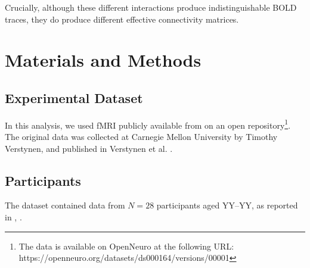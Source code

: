 \documentclass[10pt,letterpaper]{article}
\begin{document}
Crucially, although these different interactions produce indistinguishable BOLD traces, they do produce different effective connectivity matrices.


\section{Materials and Methods}

\subsection{Experimental Dataset}

In this analysis, we used fMRI publicly available from on an open repository\footnote{The data is available on OpenNeuro at the following URL:  https://openneuro.org/datasets/ds000164/versions/00001}. The original data was collected at Carnegie Mellon University by Timothy Verstynen, and published in Verstynen et al. \cite{Verstynen2014}.

\subsection{Participants}

The dataset contained data from $N=28$ participants aged YY--YY, as reported in \citeauthor{Verstynen2014}, \citeyear{Verstynen2014}.
\end{document}
